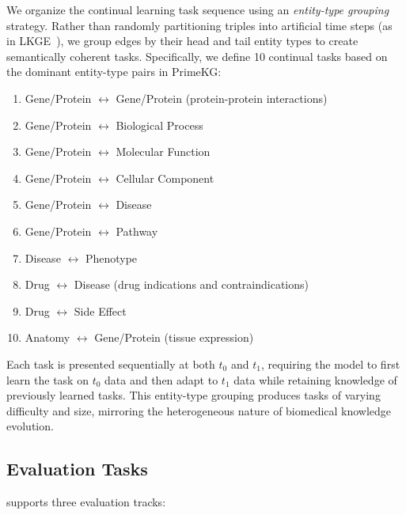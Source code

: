 We organize the continual learning task sequence using an \emph{entity-type grouping} strategy.
Rather than randomly partitioning triples into artificial time steps (as in LKGE~\citep{Cui2023}), we group edges by their head and tail entity types to create semantically coherent tasks.
Specifically, we define 10 continual tasks based on the dominant entity-type pairs in PrimeKG:
\begin{enumerate}
    \item Gene/Protein $\leftrightarrow$ Gene/Protein (protein-protein interactions)
    \item Gene/Protein $\leftrightarrow$ Biological Process
    \item Gene/Protein $\leftrightarrow$ Molecular Function
    \item Gene/Protein $\leftrightarrow$ Cellular Component
    \item Gene/Protein $\leftrightarrow$ Disease
    \item Gene/Protein $\leftrightarrow$ Pathway
    \item Disease $\leftrightarrow$ Phenotype
    \item Drug $\leftrightarrow$ Disease (drug indications and contraindications)
    \item Drug $\leftrightarrow$ Side Effect
    \item Anatomy $\leftrightarrow$ Gene/Protein (tissue expression)
\end{enumerate}

Each task is presented sequentially at both $t_0$ and $t_1$, requiring the model to first learn the task on $t_0$ data and then adapt to $t_1$ data while retaining knowledge of previously learned tasks.
This entity-type grouping produces tasks of varying difficulty and size, mirroring the heterogeneous nature of biomedical knowledge evolution.

\subsection{Evaluation Tasks}
\label{sec:eval_tasks}

\ours supports three evaluation tracks:

